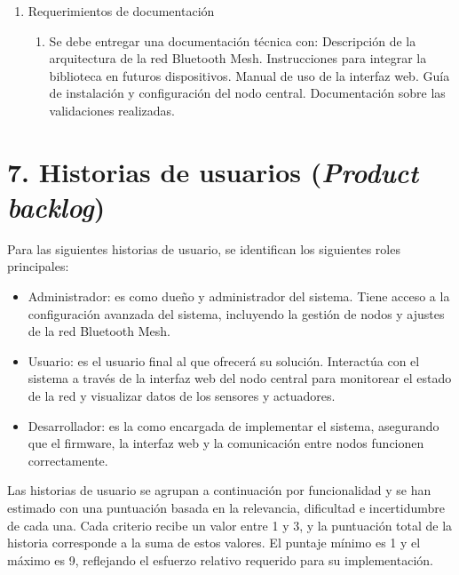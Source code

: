 \documentclass[
11pt, %
]{charter}
\begin{document}
\begin{enumerate}
\item Requerimientos de documentación
	\begin{enumerate}
		\item Se debe entregar una documentación técnica con:
			\subitem Descripción de la arquitectura de la red Bluetooth Mesh.
			\subitem Instrucciones para integrar la biblioteca en futuros dispositivos.
			\subitem Manual de uso de la interfaz web.
			\subitem Guía de instalación y configuración del nodo central.
			\subitem Documentación sobre las validaciones realizadas.
	\end{enumerate}

\end{enumerate}


\section{7. Historias de usuarios (\textit{Product backlog})}
\label{sec:backlog}

Para las siguientes historias de usuario, se identifican los siguientes roles principales:

\begin{itemize}
	\item Administrador: es {\empclientename} como dueño y administrador del sistema. Tiene acceso a la configuración avanzada del sistema, incluyendo la gestión de nodos y ajustes de la red Bluetooth Mesh.
	\item Usuario: es el usuario final al que {\empclientename} ofrecerá su solución. Interactúa con el sistema a través de la interfaz web del nodo central para monitorear el estado de la red y visualizar datos de los sensores y actuadores.
	\item Desarrollador: es la {\authorname} como encargada de implementar el sistema, asegurando que el firmware, la interfaz web y la comunicación entre nodos funcionen correctamente.
\end{itemize}

Las historias de usuario se agrupan a continuación por funcionalidad y se han estimado con una puntuación basada en la relevancia, dificultad e incertidumbre de cada una. Cada criterio recibe un valor entre 1 y 3, y la puntuación total de la historia corresponde a la suma de estos valores. El puntaje mínimo es 1 y el máximo es 9, reflejando el esfuerzo relativo requerido para su implementación.
\end{document}
